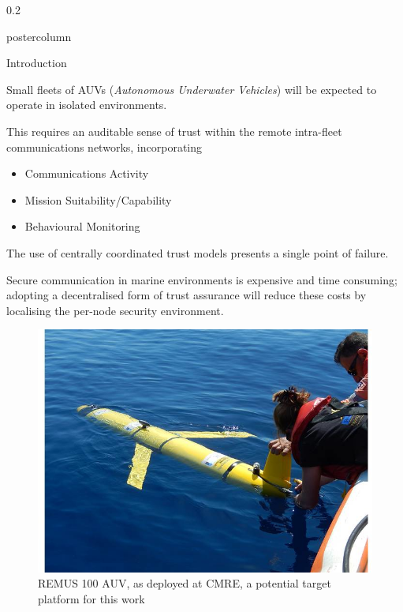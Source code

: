 \documentclass[final,hyperref={pdfpagelabels=false}]{beamer}
\def\colwidth{0.2\linewidth}
\begin{document}
\begin{frame}[fragile]
\begin{columns}[T]
\begin{column}{\colwidth}
\begin{beamercolorbox}[center,wd=\textwidth]{postercolumn}
\begin{minipage}[T]{.98\textwidth}
{\begin{block}{Introduction}
            \vspace{0.3\baselineskip}

            Small fleets of AUVs (\emph{Autonomous Underwater Vehicles}) will be expected to operate in isolated environments.
            \vspace{0.3\baselineskip}

            This requires an auditable sense of trust within the remote intra-fleet communications networks, incorporating
            \begin{itemize}
              \item Communications Activity
              \item Mission Suitability/Capability
              \item Behavioural Monitoring
            \end{itemize}

            \vspace{0.3\baselineskip}

            The use of centrally coordinated trust models presents a single point of failure.

            \vspace{0.3\baselineskip}

            Secure communication in marine environments is expensive and time consuming; adopting a decentralised form of trust assurance will reduce these costs by localising the per-node security environment.

            \begin{figure}[h]
              \centering
              \includegraphics[width=0.6\linewidth]{remus100cmre}
              \vspace{1ex}
              \caption{REMUS 100 AUV, as deployed at CMRE, a potential target platform for this work}
            \end{figure}




\end{block}}
\end{minipage}
\end{beamercolorbox}
\end{column}
\end{columns}
\end{frame}
\end{document}
